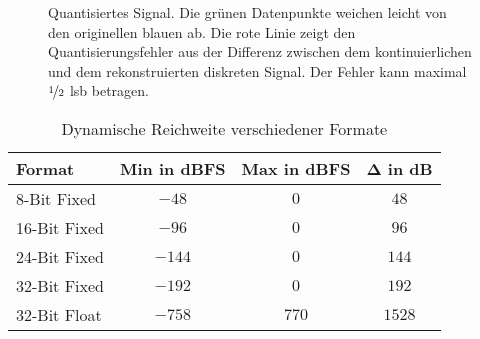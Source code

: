 \begin{figure}[h]
    \centering
    \caption[Quantisiertes Signal]{Quantisiertes Signal. Die grünen Datenpunkte weichen leicht von den originellen blauen ab. Die rote Linie zeigt den Quantisierungsfehler aus der Differenz zwischen dem kontinuierlichen und dem rekonstruierten diskreten Signal. Der Fehler kann maximal $\nicefrac{1}{2}$ \gls{lsb} betragen.}
    \label{fig:quantized-signal}
\end{figure}

\begin{table}
    \centering
    \caption[Dynamische Reichweite verschiedener Formate]{Dynamische Reichweite verschiedener Formate}
    \vspace*{11pt}
    \begin{tabular}{lccc}
        \hline
        \textbf{Format} & \textbf{Min} in \gls{dBFS} & \textbf{Max} in \gls{dBFS} & $\boldsymbol{\Delta}$ in dB \\ \hline \hline
        8-Bit Fixed & $-48$ & $0$ & $48$ \\ \hline
        16-Bit Fixed & $-96$ & $0$ & $96$ \\ \hline
        24-Bit Fixed & $-144$ & $0$ & $144$ \\ \hline
        32-Bit Fixed & $-192$ & $0$ & $192$ \\ \hline
        32-Bit Float & $-758$ & $770$ & $1528$ \\ \hline
    \end{tabular}
    \label{tab:dynamic-range}
\end{table}

